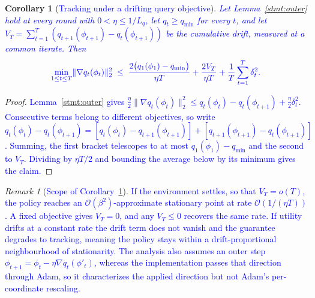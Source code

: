 \documentclass[journal]{IEEEtran}
\newtheorem{corollary}{Corollary}
\theoremstyle{remark}
\newtheorem{remark}{Remark}
\newcommand{\revtwo}[1]{\textcolor{blue}{#1}}
\newcommand{\revtwoeq}{\color{blue}}
\begin{document}
{\begin{corollary}[\revtwo{Tracking under a drifting query objective}]\label{cor:rate}
\revtwo{Let Lemma~\ref{stmt:outer} hold at every round with $0<\eta\le 1/L_q$, let $q_t\ge q_{\min}$ for every $t$, and let $V_T=\sum_{t=1}^{T}(q_{t+1}(\phi_{t+1})-q_t(\phi_{t+1}))$ be the cumulative drift, measured at a common iterate. Then}
\[
\revtwoeq \min_{1\le t\le T}\lVert\nabla q_t(\phi_t)\rVert_2^2\;\le\;
\frac{2\bigl(q_1(\phi_1)-q_{\min}\bigr)}{\eta T}+\frac{2V_T}{\eta T}+\frac{1}{T}\sum_{t=1}^{T}\delta_t^2 .
\]
\end{corollary}
\begin{proof}
\revtwo{Lemma~\ref{stmt:outer} gives $\tfrac{\eta}{2}\lVert\nabla q_t(\phi_t)\rVert_2^2\le q_t(\phi_t)-q_t(\phi_{t+1})+\tfrac{\eta}{2}\delta_t^2$. Consecutive terms belong to different objectives, so write $q_t(\phi_t)-q_t(\phi_{t+1})=[q_t(\phi_t)-q_{t+1}(\phi_{t+1})]+[q_{t+1}(\phi_{t+1})-q_t(\phi_{t+1})]$. Summing, the first bracket telescopes to at most $q_1(\phi_1)-q_{\min}$ and the second to $V_T$. Dividing by $\eta T/2$ and bounding the average below by its minimum gives the claim.}
\end{proof}

\begin{remark}[\revtwo{Scope of Corollary~\ref{cor:rate}}]\label{rem:reading}
\revtwo{If the environment settles, so that $V_T=o(T)$, the policy reaches an $\mathcal{O}(\beta^2)$-approximate stationary point at rate $\mathcal{O}(1/(\eta T))$. A fixed objective gives $V_T=0$, and any $V_T\le 0$ recovers the same rate. If utility drifts at a constant rate the drift term does not vanish and the guarantee degrades to tracking, meaning the policy stays within a drift-proportional neighbourhood of stationarity. The analysis also assumes an outer step $\phi_{t+1}=\phi_t-\eta\nabla q_t(\phi'_t)$, whereas the implementation passes that direction through Adam, so it characterizes the applied direction but not Adam's per-coordinate rescaling.}
\end{remark}
\color{black}
}
\end{document}
